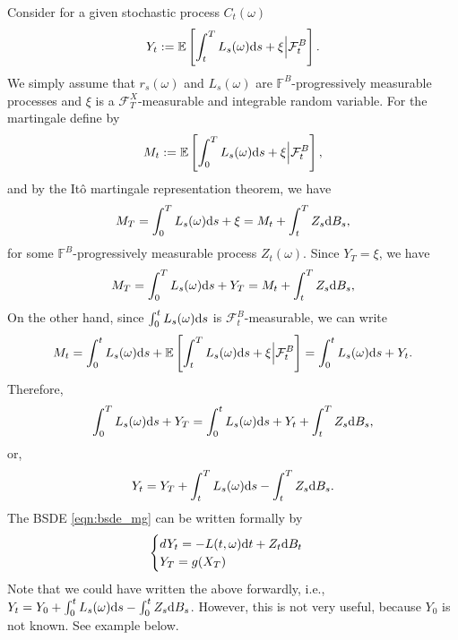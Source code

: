 \documentclass[11pt]{book}
\newcommand{\dd}{\text{\normalfont d}}
\newcommand{\dt}{\text{\normalfont d}t}
\newcommand{\ds}{\text{\normalfont d}s}
\begin{document}
Consider for a given stochastic process $C_t(\omega)$ 
\begin{equation}
Y_t:=\mathbb{E}\left[\int_t^T   L_s(\omega){{\ds}} + \xi \Big|\mathcal{F}^B_t\right].
\end{equation}
We simply assume that $r_s(\omega)$ and $L_s(\omega)$ are $\mathbb{F}^B$-progressively measurable processes and $\xi$ is a $\mathcal{F}_T^X$-measurable and integrable random variable. For the martingale define by 
\begin{equation}
M_t:=\mathbb{E}\left[\int_0^T  L_s(\omega){{\ds}}+\xi\Big|\mathcal{F}^B_t\right],
\end{equation}
and by the It\^o martingale representation theorem, we have
\begin{equation}
M_T=\int_0^T   L_s(\omega){{\ds}}+\xi=M_t+\int_t^TZ_s{\dd}B_s,
\end{equation}
for some $\mathbb{F}^B$-progressively measurable process $Z_t(\omega)$.
Since $Y_T=\xi$, we have 
\begin{equation}
M_T=\int_0^T   L_s(\omega){{\ds}}+Y_T=M_t+\int_t^TZ_s{\dd}B_s,
\end{equation}
On the other hand,
since $\int_0^t   L_s(\omega){{\ds}}$ is $\mathcal{F}^B_t$-measurable, we can write
\begin{equation}
M_t=\int_0^t   L_s(\omega){{\ds}}+\mathbb{E}\left[\int_t^T   L_s(\omega){{\ds}}+\xi\Big|\mathcal{F}^B_t\right]=\int_0^t   L_s(\omega){{\ds}}+Y_t.
\end{equation}
Therefore,
\begin{equation}
\int_0^T   L_s(\omega){{\ds}}+Y_T=\int_0^t   L_s(\omega){{\ds}}+Y_t+\int_t^TZ_s{\dd}B_s,
\end{equation}
or,
\begin{equation}\label{eqn:bsde_mg}
Y_t=Y_T+\int_t^T   L_s(\omega){{\ds}}-\int_t^TZ_s{\dd}B_s.
\end{equation}
The BSDE \eqref{eqn:bsde_mg} can be written formally by 
\begin{equation}
\begin{cases}
dY_t=- L(t,\omega){{\dt}}+Z_t{\dd}B_t\\
Y_T=g(X_T)
\end{cases}
\end{equation}
Note that we could have written the above forwardly, i.e.,
$Y_t=Y_0+\int_0^t   L_s(\omega){{\ds}}-\int_0^tZ_s{\dd}B_s$. However, this is not very useful, because $Y_0$ is not known. See example below.
\end{document}
